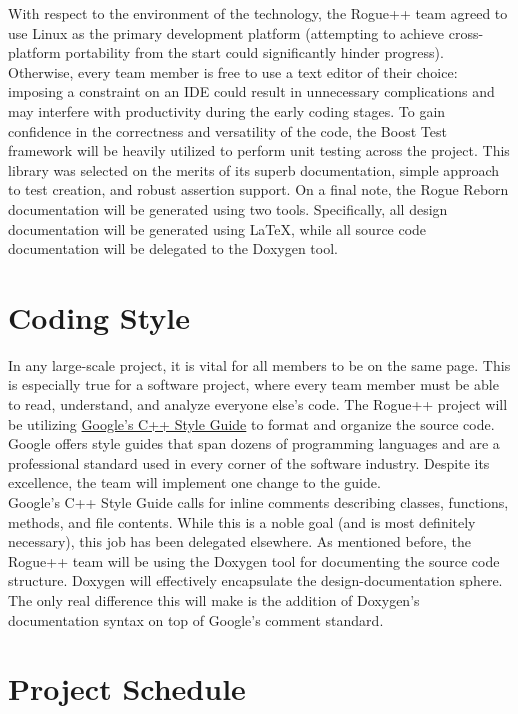 \documentclass{article}
\begin{document}
With respect to the environment of the technology, the Rogue++ team agreed to use Linux as the primary development platform (attempting to achieve cross-platform portability from the start could significantly hinder progress).  Otherwise, every team member is free to use a text editor of their choice: imposing a constraint on an IDE could result in unnecessary complications and may interfere with productivity during the early coding stages.  To gain confidence in the correctness and versatility of the code, the Boost Test framework will be heavily utilized to perform unit testing across the project.  This library was selected on the merits of its superb documentation, simple approach to test creation, and robust assertion support.  On a final note, the Rogue Reborn documentation will be generated using two tools.  Specifically, all design documentation will be generated using LaTeX, while all source code documentation will be delegated to the Doxygen tool.

\section{Coding Style}

\indent
In any large-scale project, it is vital for all members to be on the same page.  This is especially true for a software project, where every team member must be able to read, understand, and analyze everyone else's code.  The Rogue++ project will be utilizing \href{https://google.github.io/styleguide/cppguide.html}{Google's C++ Style Guide} to format and organize the source code.  Google offers style guides that span dozens of programming languages and are a professional standard used in every corner of the software industry. Despite its excellence, the team will implement one change to the guide.\\

Google's C++ Style Guide calls for inline comments describing classes, functions, methods, and file contents.  While this is a noble goal (and is most definitely necessary), this job has been delegated elsewhere.  As mentioned before, the Rogue++ team will be using the Doxygen tool for documenting the source code structure.  Doxygen will effectively encapsulate the design-documentation sphere. The only real difference this will make is the addition of Doxygen's documentation syntax on top of Google's comment standard.

\section{Project Schedule}
\end{document}

